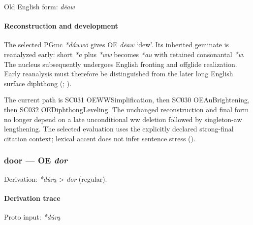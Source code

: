 \documentclass[
  british,
  a4paper,
]{article}
\begin{document}
Old English form: \emph{dēaw}

\paragraph{Reconstruction and
development}\label{reconstruction-and-development}

The selected PGmc \emph{*dáwwō} gives OE \emph{dēaw} `dew'. Its
inherited geminate is reanalyzed early: short \emph{*a} plus \emph{*ww}
becomes \emph{*au} with retained consonantal \emph{*w}. The nucleus
subsequently undergoes English fronting and offglide realization. Early
reanalysis must therefore be distinguished from the later long English
surface diphthong (; ).

The current path is SC031 OEWWSimplification, then SC030
OEAuBrightening, then SC032 OEDiphthongLeveling. The unchanged
reconstruction and final form no longer depend on a late unconditional
ww deletion followed by singleton-aw lengthening. The selected
evaluation uses the explicitly declared strong-final citation context;
lexical accent does not infer sentence stress
().

\subsubsection{\texorpdfstring{door --- OE
\emph{dor}}{door --- OE dor}}\label{door-oe-dor}

Derivation: \emph{*dúrą} \textgreater{} \emph{dor} (regular).

\paragraph{Derivation trace}\label{derivation-trace-19}

Proto input: \emph{*dúrą}

\begingroup
\setlength{\fboxsep}{6pt}
\end{document}
